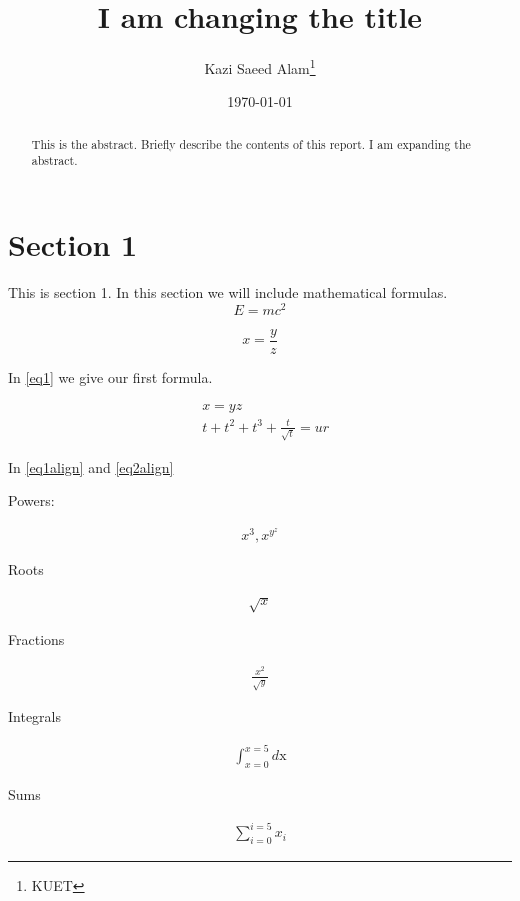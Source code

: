 \documentclass[a4paper]{article}
\title{\textbf{I am changing the title}}
\author{Kazi Saeed Alam\footnote{KUET}}
\date{\today}
\begin{document}
																			\maketitle
\begin{abstract}
This is the abstract. Briefly describe the contents of this report. I am expanding the abstract.
\end{abstract}

\section{Section 1}


This is section 1. In this section we will include mathematical formulas. 
\begin{equation}
E=mc^2
\label{eq2}
\end{equation}

\begin{equation}
x=\frac{y}{z}
\label{eq1}
\end{equation}

In \eqref{eq1} we give our first formula. 


\begin{align}
 & x = yz  \label{eq1align}  \\
 &  t +t^2+t^3+\frac{t}{\sqrt{t}} =ur  \label{eq2align}
\end{align}

In \eqref{eq1align} and \eqref{eq2align}

Powers:

\begin{align}
x^{3},  x^{y^{z}}
\end{align}

Roots

\begin{align}
\sqrt{x}
\end{align}

Fractions

\begin{align}
\frac{x^{2}}{\sqrt{y}}
\end{align}

Integrals

\begin{align}
\int_{x=0}^{x=5}   d\text{x}
\end{align}

Sums 

\begin{align}
\sum_{i=0}^{i=5} x_{i}
\end{align}
\end{document}
